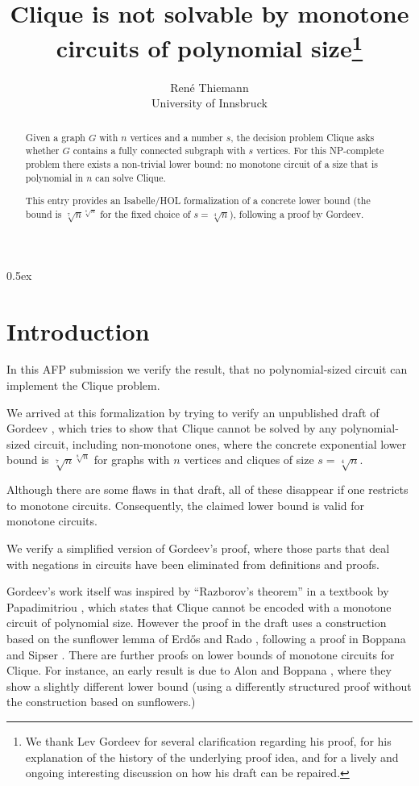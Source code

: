 \documentclass[11pt,a4paper]{article}
\begin{document}
\title{Clique is not solvable by monotone circuits of polynomial size\footnote{We thank Lev Gordeev for several clarification regarding his proof, 
for his explanation of the history of the underlying proof idea, 
and for a lively and ongoing interesting discussion on
how his draft can be repaired.}}
\author{Ren\'e Thiemann\\
  {\small University of Innsbruck}}
\maketitle

\begin{abstract}
Given a graph $G$ with $n$ vertices and a number $s$, the decision problem Clique
asks whether $G$ contains a fully connected subgraph with $s$ vertices.
For this NP-complete problem there exists
a non-trivial lower bound: 
no monotone circuit of a size that is polynomial in $n$ can solve Clique.

This entry provides an Isabelle/HOL formalization of a concrete 
lower bound (the bound is $\sqrt[7]{n}^{\sqrt[8]{n}}$ for the fixed choice 
of $s = \sqrt[4]{n}$), 
following a proof by Gordeev.
\end{abstract}

\tableofcontents

\parindent 0pt\parskip 0.5ex

\section{Introduction}
In this AFP submission we verify the result, that no polynomial-sized circuit 
can implement the Clique problem.

We arrived at this formalization by trying to verify 
an unpublished draft of Gordeev \cite{PNP}, which tries to show
that Clique cannot be solved by any polynomial-sized circuit,
including non-monotone ones, where the concrete exponential
lower bound is $\sqrt[7]{n}^{\sqrt[8]{n}}$ for graphs 
with $n$ vertices and cliques of size $s = \sqrt[4]n$.

Although there are some flaws in that draft, all of these disappear
if one restricts to monotone circuits. Consequently, the claimed
lower bound is valid for monotone circuits.

We verify a simplified version of Gordeev's proof, where those parts that
deal with negations in circuits have been eliminated from definitions and proofs.

Gordeev's work itself was inspired by ``Razborov's theorem'' 
in a textbook by Papadimitriou
\cite{P94}, which states that Clique cannot be encoded with a monotone
circuit of polynomial size. 
However the proof in the draft uses a construction based on 
the sunflower lemma of Erdős and Rado \cite{erdos_rado},
following a proof in Boppana and 
Sipser \cite{BS90}. 
There are further proofs on lower bounds of monotone circuits for Clique.
For instance, an early result is due to Alon and Boppana \cite{AlonB87},
where they show a slightly different lower bound (using a differently structured
proof without the construction based on sunflowers.)






\end{document}
